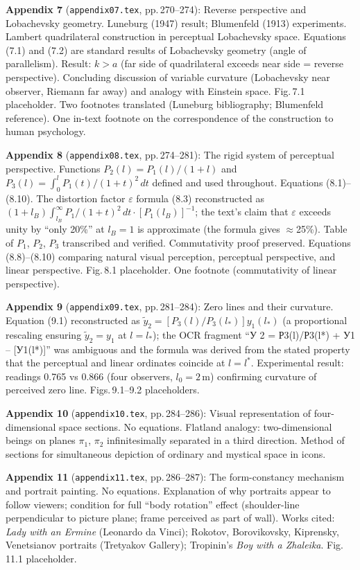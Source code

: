 \documentclass[12pt]{article}
\begin{document}
\textbf{Appendix 7} (\texttt{appendix07.tex}, pp.\,270--274): Reverse perspective and
Lobachevsky geometry. Luneburg (1947) result; Blumenfeld (1913) experiments.
Lambert quadrilateral construction in perceptual Lobachevsky space. Equations (7.1)
and (7.2) are standard results of Lobachevsky geometry (angle of parallelism). Result:
$k > a$ (far side of quadrilateral exceeds near side = reverse perspective). Concluding
discussion of variable curvature (Lobachevsky near observer, Riemann far away) and
analogy with Einstein space. Fig.\,7.1 placeholder. Two footnotes translated (Luneburg
bibliography; Blumenfeld reference). One in-text footnote on the correspondence of
the construction to human psychology.

\textbf{Appendix 8} (\texttt{appendix08.tex}, pp.\,274--281): The rigid system of
perceptual perspective. Functions $P_2(l) = P_1(l)/(1+l)$ and
$P_3(l) = \int_0^l P_1(t)/(1+t)^2\,dt$ defined and used throughout. Equations
(8.1)--(8.10). The distortion factor $\varepsilon$ formula (8.3) reconstructed as
$(1+l_B)\int_{l_B}^\infty P_1/(1+t)^2\,dt \cdot [P_1(l_B)]^{-1}$; the text's claim
that $\varepsilon$ exceeds unity by ``only 20\%'' at $l_B=1$ is approximate
(the formula gives $\approx$25\%). Table of $P_1$, $P_2$, $P_3$ transcribed and
verified. Commutativity proof preserved. Equations (8.8)--(8.10) comparing natural
visual perception, perceptual perspective, and linear perspective. Fig.\,8.1
placeholder. One footnote (commutativity of linear perspective).

\textbf{Appendix 9} (\texttt{appendix09.tex}, pp.\,281--284): Zero lines and their
curvature. Equation (9.1) reconstructed as $\tilde{y}_2 = [P_3(l)/P_3(l_*)] y_1(l_*)$
(a proportional rescaling ensuring $\tilde{y}_2 = y_1$ at $l=l_*$); the OCR fragment
``У 2 = Р3(l)/Р3(l*) + У1 -- [У1(l*)]'' was ambiguous and the formula was derived
from the stated property that the perceptual and linear ordinates coincide at $l = l^*$.
Experimental result: readings 0.765 vs 0.866 (four observers, $l_0 = 2$\,m) confirming
curvature of perceived zero line. Figs.\,9.1--9.2 placeholders.

\textbf{Appendix 10} (\texttt{appendix10.tex}, pp.\,284--286): Visual representation of
four-dimensional space sections. No equations. Flatland analogy: two-dimensional beings
on planes $\pi_1$, $\pi_2$ infinitesimally separated in a third direction. Method of
sections for simultaneous depiction of ordinary and mystical space in icons.

\textbf{Appendix 11} (\texttt{appendix11.tex}, pp.\,286--287): The form-constancy
mechanism and portrait painting. No equations. Explanation of why portraits appear to
follow viewers; condition for full ``body rotation'' effect (shoulder-line perpendicular
to picture plane; frame perceived as part of wall). Works cited: \emph{Lady with an
Ermine} (Leonardo da Vinci); Rokotov, Borovikovsky, Kiprensky, Venetsianov portraits
(Tretyakov Gallery); Tropinin's \emph{Boy with a Zhaleika}. Fig.\,11.1 placeholder.
\end{document}
